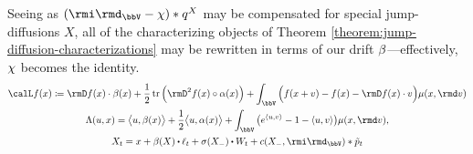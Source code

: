 Seeing as $(\id_\vecSpace - \trunc) \ast \jumpMeas^\X$ may be compensated for special jump-diffusions $X$, all of the characterizing objects of Theorem \ref{theorem:jump-diffusion-characterizations} may be rewritten in terms of our drift $\beta$---effectively, $\chi$ becomes the identity.
\begin{gather*}
  \generator f(\stateVar) \defeq \Der f(\stateVar) \cdot \affDrift(\stateVar) + \frac12 \tr\Big( \Hess f(\stateVar) \circ \affDiff(\stateVar) \Big) + \int_\vecSpace \Big( f(\stateVar + \markVar) - f(\stateVar) - \Der f(\stateVar) \cdot \markVar \Big) \affJump(\stateVar, \rmd\markVar) \\
  \ode(\momentVar, \stateVar) = \bprj{\momentVar}{\affDrift(\stateVar)} + \frac12\bprj{\momentVar}{\affDiff(\stateVar)} + \int_\vecSpace \big( e^\prj{\momentVar}{\markVar} - 1 - \prj{\momentVar}{\markVar} \big) \affJump(\stateVar, \rmd\markVar), \\
  \X_t = \stateVar + \affDrift(\X) \shortInt \leb_t + \sigma(\X_-) \shortInt \W_t + \thinner(\X_-, \id_\vecSpace) \ast \compensate{\poisRM}_t 
\end{gather*}
